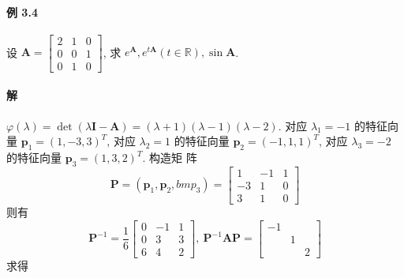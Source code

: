 \paragraph*{例 3.4} 设 $\bm{A} = \begin{bmatrix}
    2 & 1 & 0 \\
    0 & 0 & 1 \\
    0 & 1 & 0
\end{bmatrix}$, 求 $e^{\bm{A}}, e^{t\bm{A}}(t\in \mathbb{R}), \sin\bm{A}$.

\paragraph*{解} $\varphi(\lambda) = \det(\lambda\bm{I} - \bm{A}) = (\lambda + 1)(\lambda - 1)(\lambda - 2)$. 对应 $\lambda_1 = -1$ 的特征向量 $\bm{p}_1 = (1, -3, 3)^T$,
对应 $\lambda_2 = 1$ 的特征向量 $\bm{p}_2 = (-1, 1, 1)^T$, 对应 $\lambda_3 = -2$ 的特征向量 $\bm{p}_3 = (1, 3, 2)^T$. 构造矩
阵
$$
    \bm{P} = (\bm{p}_1, \bm{p}_2, bm{p}_3) = \begin{bmatrix}
        1  & -1 & 1 \\
        -3 & 1  & 0 \\
        3  & 1  & 0
    \end{bmatrix}
$$
则有
$$
    \bm{P}^{-1} = \dfrac{1}{6}\begin{bmatrix}
        0 & -1 & 1 \\
        0 & 3  & 3 \\
        6 & 4  & 2
    \end{bmatrix}, \ \bm{P}^{-1}\bm{AP} = \begin{bmatrix}
        -1 &   &   \\
           & 1 &   \\
           &   & 2
    \end{bmatrix}
$$
求得
